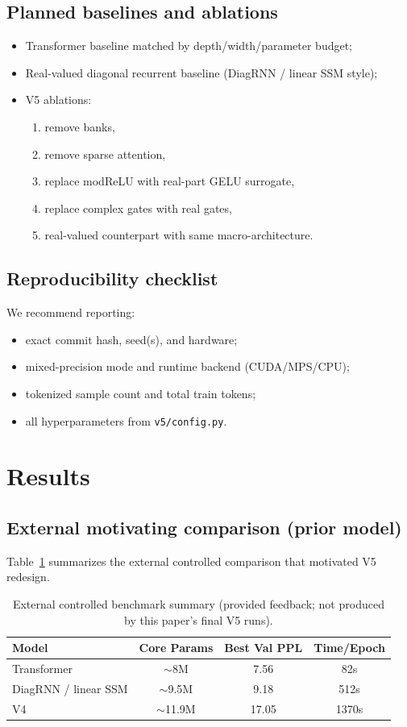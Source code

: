 \documentclass[11pt]{article}
\begin{document}
\subsection{Planned baselines and ablations}
\begin{itemize}[leftmargin=1.2em]
  \item Transformer baseline matched by depth/width/parameter budget;
  \item Real-valued diagonal recurrent baseline (DiagRNN / linear SSM style);
  \item V5 ablations:
  \begin{enumerate}[label=(\alph*),leftmargin=1.2em]
    \item remove banks,
    \item remove sparse attention,
    \item replace modReLU with real-part GELU surrogate,
    \item replace complex gates with real gates,
    \item real-valued counterpart with same macro-architecture.
  \end{enumerate}
\end{itemize}

\subsection{Reproducibility checklist}
We recommend reporting:
\begin{itemize}[leftmargin=1.2em]
  \item exact commit hash, seed(s), and hardware;
  \item mixed-precision mode and runtime backend (CUDA/MPS/CPU);
  \item tokenized sample count and total train tokens;
  \item all hyperparameters from \texttt{v5/config.py}.
\end{itemize}

\section{Results}
\subsection{External motivating comparison (prior model)}
Table~\ref{tab:external} summarizes the external controlled comparison that motivated V5 redesign.

\begin{table}[h]
\centering
\caption{External controlled benchmark summary (provided feedback; not produced by this paper's final V5 runs).}
\label{tab:external}
\begin{tabular}{lccc}
\toprule
Model & Core Params & Best Val PPL & Time/Epoch \\
\midrule
Transformer & $\sim$8M & 7.56 & 82s \\
DiagRNN / linear SSM & $\sim$9.5M & 9.18 & 512s \\
V4 & $\sim$11.9M & 17.05 & 1370s \\
\bottomrule
\end{tabular}
\end{table}
\end{document}

